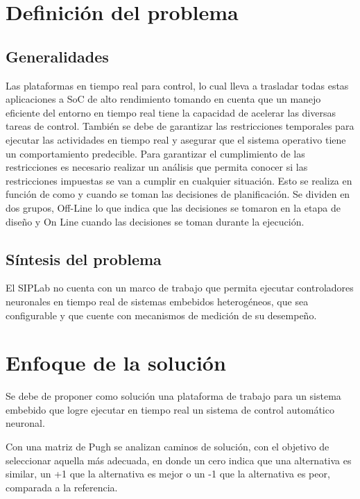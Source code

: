 \documentclass[12pt]{article}
\begin{document}
\newpage

\section{Definición del problema}

\subsection{Generalidades}




Las plataformas en tiempo real para control, lo cual lleva a trasladar todas estas aplicaciones a SoC de alto rendimiento tomando en cuenta que un manejo eficiente del entorno en tiempo real tiene la capacidad de acelerar las diversas tareas de control. También se debe de garantizar las restricciones temporales para ejecutar las actividades en tiempo real y asegurar que el sistema operativo tiene un comportamiento predecible. Para garantizar el cumplimiento de las restricciones es necesario realizar un análisis que permita conocer si las restricciones impuestas se van a cumplir en cualquier situación. Esto se realiza en función de como y cuando se toman las decisiones de planificación. Se dividen en dos grupos, Off-Line lo que indica que las decisiones se tomaron en la etapa de diseño y On Line cuando las decisiones se toman durante la ejecución.



\subsection{Síntesis del problema}

El SIPLab no cuenta con un marco de trabajo que permita ejecutar controladores neuronales en tiempo real de sistemas embebidos heterogéneos, que sea configurable y que cuente con mecanismos de medición de su desempeño.


\section{Enfoque de la solución}

Se debe de proponer como solución una plataforma de trabajo para un sistema embebido que logre ejecutar en tiempo real un sistema de control automático neuronal.


Con una matriz de Pugh se analizan caminos de solución, con el objetivo de seleccionar aquella más adecuada, en donde un cero indica que una alternativa es similar, un +1 que la alternativa es mejor o un -1 que la alternativa es peor, comparada a la referencia.
\end{document}

